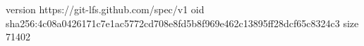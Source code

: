 version https://git-lfs.github.com/spec/v1
oid sha256:4c08a0426171c7e1ac5772cd708e8fd5b8f969e462c13895ff28dcf65c8324c3
size 71402
